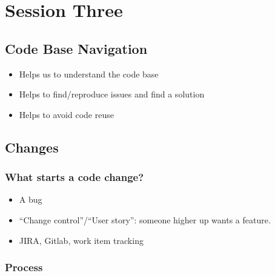 \section{Session Three}\label{sec:session_three}

\subsection{Code Base Navigation}\label{sub:code_base_navigation}

\begin{itemize}
	\item Helps us to understand the code base
	\item Helps to find/reproduce issues and find a solution
	\item Helps to avoid code reuse
\end{itemize}

\subsection{Changes}\label{sub:changes}

\subsubsection{What starts a code change?}\label{ssub:what_starts_a_code_change_}

\begin{itemize}
	\item A bug
	\item ``Change control''/``User story'': someone higher up wants a feature.
	\item JIRA, Gitlab, work item tracking
\end{itemize}

\subsubsection{Process}\label{ssub:process}


